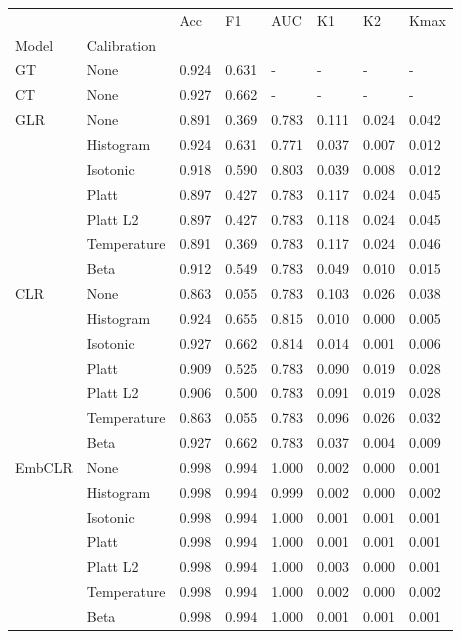 \begin{tabular}{llllllll}
\toprule
 &  & Acc & F1 & AUC & K1 & K2 & Kmax \\
Model & Calibration &  &  &  &  &  &  \\
\midrule
GT & None & 0.924 & 0.631 & - & - & - & - \\
\cline{1-8}
CT & None & 0.927 & 0.662 & - & - & - & - \\
\cline{1-8}
\multirow[t]{7}{*}{GLR} & None & 0.891 & 0.369 & 0.783 & 0.111 & 0.024 & 0.042 \\
 & Histogram & 0.924 & 0.631 & 0.771 & 0.037 & 0.007 & 0.012 \\
 & Isotonic & 0.918 & 0.590 & 0.803 & 0.039 & 0.008 & 0.012 \\
 & Platt & 0.897 & 0.427 & 0.783 & 0.117 & 0.024 & 0.045 \\
 & Platt L2 & 0.897 & 0.427 & 0.783 & 0.118 & 0.024 & 0.045 \\
 & Temperature & 0.891 & 0.369 & 0.783 & 0.117 & 0.024 & 0.046 \\
 & Beta & 0.912 & 0.549 & 0.783 & 0.049 & 0.010 & 0.015 \\
\cline{1-8}
\multirow[t]{7}{*}{CLR} & None & 0.863 & 0.055 & 0.783 & 0.103 & 0.026 & 0.038 \\
 & Histogram & 0.924 & 0.655 & 0.815 & 0.010 & 0.000 & 0.005 \\
 & Isotonic & 0.927 & 0.662 & 0.814 & 0.014 & 0.001 & 0.006 \\
 & Platt & 0.909 & 0.525 & 0.783 & 0.090 & 0.019 & 0.028 \\
 & Platt L2 & 0.906 & 0.500 & 0.783 & 0.091 & 0.019 & 0.028 \\
 & Temperature & 0.863 & 0.055 & 0.783 & 0.096 & 0.026 & 0.032 \\
 & Beta & 0.927 & 0.662 & 0.783 & 0.037 & 0.004 & 0.009 \\
\cline{1-8}
\multirow[t]{7}{*}{EmbCLR} & None & 0.998 & 0.994 & 1.000 & 0.002 & 0.000 & 0.001 \\
 & Histogram & 0.998 & 0.994 & 0.999 & 0.002 & 0.000 & 0.002 \\
 & Isotonic & 0.998 & 0.994 & 1.000 & 0.001 & 0.001 & 0.001 \\
 & Platt & 0.998 & 0.994 & 1.000 & 0.001 & 0.001 & 0.001 \\
 & Platt L2 & 0.998 & 0.994 & 1.000 & 0.003 & 0.000 & 0.001 \\
 & Temperature & 0.998 & 0.994 & 1.000 & 0.002 & 0.000 & 0.002 \\
 & Beta & 0.998 & 0.994 & 1.000 & 0.001 & 0.001 & 0.001 \\
\cline{1-8}
\bottomrule
\end{tabular}
